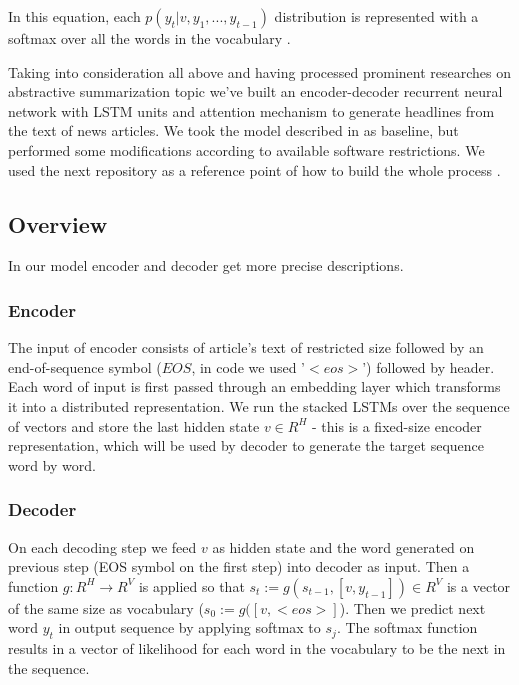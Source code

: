 In this equation, each $p(y_t|v, y_1, ..., y_{t-1})$ distribution is represented with a softmax over all the
words in the vocabulary \cite{seq2seq_with_NN}.

Taking into consideration all above and having processed prominent researches on abstractive summarization topic we've built an encoder-decoder recurrent neural network with LSTM units and attention mechanism to generate headlines from the text of news articles. We took the model described in \cite{model-baseline-article} as baseline, but performed some modifications according to available software restrictions. We used the next repository as a reference point of how to build the whole process \cite{reference-repository}.

\subsection{Overview}
In our model encoder and decoder get more precise descriptions.

\subsubsection{Encoder}
The input of encoder consists of article's text of restricted size followed by an end-of-sequence symbol ($EOS$, in code we used '$<eos>$') followed by header. Each word of input is first passed through an embedding layer which transforms it into a distributed representation.
We run the stacked LSTMs over the sequence of vectors and store the last hidden state $v \in R^H$ - this is a fixed-size encoder representation, which will be used by decoder to generate the target sequence word by word.   

\subsubsection{Decoder}
On each decoding step we feed $v$ as hidden state and the word generated on previous step (EOS symbol on the first step) into decoder as input.
Then a function $g: R^H \rightarrow R^V$ is applied so that $s_t := g(s_{t-1}, [v, y_{t-1}]) \in R^V$ is a vector of the same size as vocabulary ($s_0 := g([v, <eos>]$). Then we predict next word $y_t$ in output sequence by applying softmax to $s_j$. The softmax function results in a vector of likelihood for each word in the vocabulary to be the next in the sequence. 

